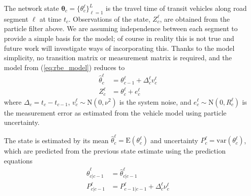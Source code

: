 The network state $\boldsymbol\theta_c = \{\theta_c^\ell\}_{\ell = 1}^L$ is the travel time 
of transit vehicles along road segment $\ell$ at time $t_c$.
Observations of the state, $Z_c^\ell$, are obtained from the particle filter above.
We are assuming independence between each segment
to provide a simple basis for the model; of course in reality this
is not true and future work will investigate ways of incorporating this.
Thanks to the model simplicity,
no transition matrix or measurement matrix is required,
and the model from (\ref{eq:rbe_model}) reduces to
\begin{equation}
\begin{split}
\hat \theta_c^\ell &= \theta_{c-1}^\ell + \Delta_c^\ell v_c^\ell \\
Z_c^\ell &= \theta_c^\ell + e_c^\ell
\end{split}
\end{equation}
where $\Delta_c = t_c - t_{c-1}$,
$v_c^\ell \sim \mathrm{N}(0, \nu^2)$ is the system noise,
and $e_c^\ell \sim \mathrm{N}(0, R_c^\ell)$ is the measurement error
as estimated from the vehicle model using particle uncertainty.

The state is estimated by its mean $\hat \theta_c^\ell = \mathrm{E}(\theta_c^\ell)$
and uncertainty $P_c^\ell = \mathrm{var}(\theta_c^\ell)$,
which are predicted from the previous state estimate using the prediction
equations
\begin{align*}
\label{eq:kf_transition}
\hat \theta^\ell_{c|c-1} &= \hat \theta^\ell_{c|c-1} \\
P^\ell_{c|c-1} &= P^\ell_{c-1|c-1} + \Delta_c^\ell \nu_c^\ell
\end{align*}

